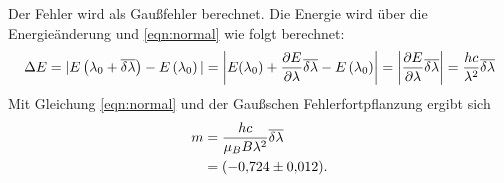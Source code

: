 Der Fehler wird als Gaußfehler berechnet.
Die Energie wird über die Energieänderung und \eqref{eqn:normal} wie folgt berechnet:
\begin{equation}
  \notag
  \Delta E = | E \left( \lambda_{0} + \overline{\delta \lambda} \right) - E \left( \lambda_{0} \right) |
           = \left| E( \lambda_{0}) + \frac{\partial E}{\partial \lambda}\overline{\delta \lambda} - E \left( \lambda_{0} \right) \right|
           = \left| \frac{\partial E}{\partial \lambda}\overline{\delta \lambda} \right|
           = \frac{h c}{ \lambda^2 } \overline{\delta \lambda }
           \label{eqn:energie}
\end{equation}
Mit Gleichung \eqref{eqn:normal} und der Gaußschen Fehlerfortpflanzung ergibt sich
\begin{align*}
  m &= \frac{h c}{\mu_B B \lambda^2 } \overline{\delta \lambda } \\
    &= \SI{-0.724 \pm 0.012}{}.
\end{align*}

\FloatBarrier
